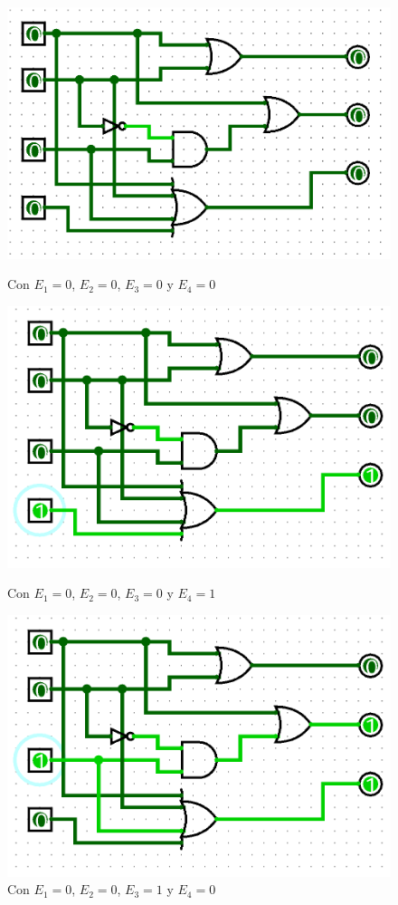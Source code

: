 \begin{figure}
	\centering
    \includegraphics[height = 0.25\textheight]{recursos/Ejercicio4/1ej4.png}\par
    \caption*{Con $E_{1}=0$, $E_{2}=0$, $E_{3}=0$ y $E_{4}=0$}
    \includegraphics[height = 0.25\textheight]{recursos/Ejercicio4/2ej4.png}\par
    \caption*{Con $E_{1}=0$, $E_{2}=0$, $E_{3}=0$ y $E_{4}=1$}
    \includegraphics[height = 0.25\textheight]{recursos/Ejercicio4/3ej4.png}\par
    \caption*{Con $E_{1}=0$, $E_{2}=0$, $E_{3}=1$ y $E_{4}=0$}
\end{figure}
